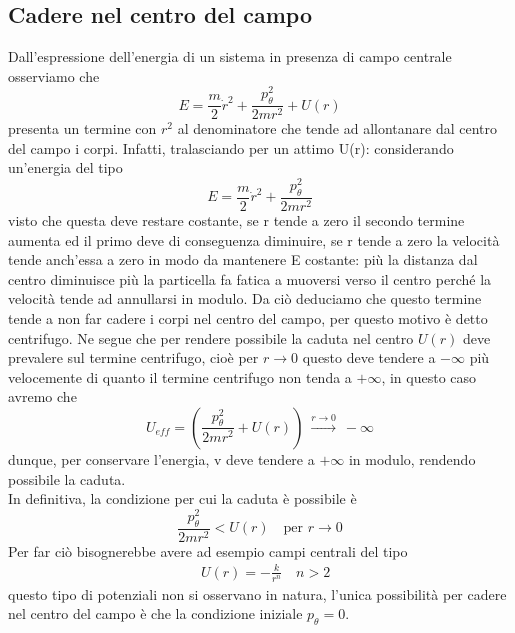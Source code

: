 \documentclass[
10pt, %
a4paper, %
oneside, %
headinclude,footinclude, %
BCOR5mm, %
]{scrartcl}
\begin{document}
\subsection{Cadere nel centro del campo}
Dall'espressione dell'energia di un sistema in presenza di campo centrale osserviamo che 
\[E = \frac{m}{2}\dot{r}^2+\frac{p_{\theta}^2 }{2mr^2}+U(r)\]
presenta un termine con \(r^2\) al denominatore che tende ad allontanare dal centro del campo i corpi. Infatti, tralasciando per un attimo U(r): considerando un'energia del tipo
\[E = \frac{m}{2}\dot{r}^2+\frac{p_{\theta}^2 }{2mr^2}\]
visto che questa deve restare costante, se r tende a zero il secondo termine aumenta ed il primo deve di conseguenza diminuire, se r tende a zero la velocità tende anch'essa a zero in modo da mantenere E costante: più la distanza dal centro diminuisce più la particella fa fatica a muoversi verso il centro perché la velocità tende ad annullarsi in modulo. Da ciò deduciamo che questo termine tende a non far cadere i corpi nel centro del campo, per questo motivo è detto centrifugo. Ne segue che per rendere possibile la caduta nel centro \(U(r)\) deve prevalere sul termine centrifugo, cioè per \(r\rightarrow 0\) questo deve tendere a $-\infty$ più velocemente di quanto il termine centrifugo non tenda a \(+\infty\), in questo caso avremo che 
\[U_{eff} = \left(\frac{p_{\theta}^2 }{2mr^2}+U(r)\right)\ \xrightarrow{r\rightarrow 0}\  -\infty \]
dunque, per conservare l'energia, v deve tendere a \(+\infty\) in modulo, rendendo possibile la caduta.\\
In definitiva, la condizione per cui la caduta è possibile è
\[\frac{p_{\theta}^2 }{2mr^2}<U(r)\quad \text{per }r\to0\]
Per far ciò bisognerebbe avere ad esempio campi centrali del tipo
\begin{align}\label{eq:caduta-centro}
	&U(r) = -\frac{k}{r^n}\quad n>2
\end{align}
questo tipo di potenziali non si osservano in natura, l'unica possibilità per cadere nel centro del campo è che la condizione iniziale \(p_\theta = 0\).
\end{document}
